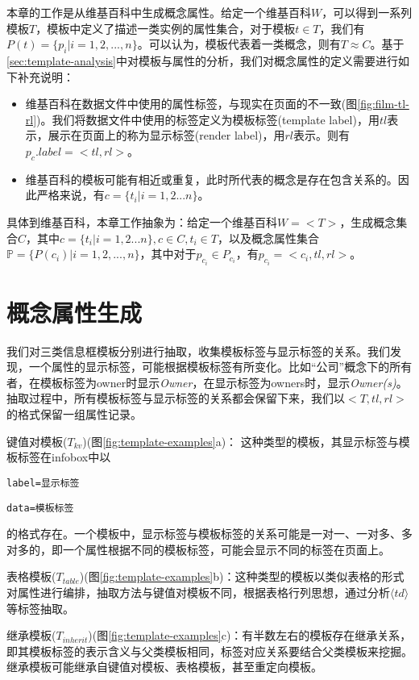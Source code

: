 本章的工作是从维基百科中生成概念属性。给定一个维基百科$W$，可以得到一系列模板$T$，模板中定义了描述一类实例的属性集合，对于模板$t \in T$，我们有$P(t)=\{p_{i}|i=1,2,...,n\}$。可以认为，模板代表着一类概念，则有$T \approx C$。基于\ref{sec:template-analysis}中对模板与属性的分析，我们对概念属性的定义需要进行如下补充说明：
\begin{itemize}
\item 维基百科在数据文件中使用的属性标签，与现实在页面的不一致(图\ref{fig:film-tl-rl})。我们将数据文件中使用的标签定义为模板标签(template label)，用$tl$表示，展示在页面上的称为显示标签(render label)，用$rl$表示。则有$p_{c}.label = <tl, rl>$。
\item 维基百科的模板可能有相近或重复，此时所代表的概念是存在包含关系的。因此严格来说，有$c = \{t_i|i=1,2...n\}$。
\end{itemize}

具体到维基百科，本章工作抽象为：给定一个维基百科$W = <T>$，生成概念集合$C$，其中$c = \{t_i|i=1,2...n\}, c \in C, t_i \in T$，以及概念属性集合$\mathbb{P} = \{P(c_i)| i = 1,2,...,n\}$，其中对于$p_{c_i} \in P_{c_i}$，有$p_{c_i} = <c_i, tl, rl>$。

\section{概念属性生成}
\label{sec:property-extraction}

我们对三类信息框模板分别进行抽取，收集模板标签与显示标签的关系。我们发现，一个属性的显示标签，可能根据模板标签有所变化。比如“公司”概念下的所有者，在模板标签为owner时显示\textit{Owner}，在显示标签为owners时，显示\textit{Owner(s)}。抽取过程中，所有模板标签与显示标签的关系都会保留下来，我们以$<T, tl, rl>$ 的格式保留一组属性记录。

{\heiti 键值对模板($T_{kv}$)(图\ref{fig:template-examples}a)：} 这种类型的模板，其显示标签与模板标签在infobox中以

\begin{center}
\verb"label=显示标签"

\verb"data=模板标签"
\end{center}
的格式存在。一个模板中，显示标签与模板标签的关系可能是一对一、一对多、多对多的，即一个属性根据不同的模板标签，可能会显示不同的标签在页面上。

{\heiti 表格模板($T_{table}$)(图\ref{fig:template-examples}b)：}这种类型的模板以类似表格的形式对属性进行编排，抽取方法与键值对模板不同，根据表格行列思想，通过分析$\langle td\rangle$等标签抽取。

{\heiti 继承模板($T_{inherit}$)(图\ref{fig:template-examples}c)：}有半数左右的模板存在继承关系，即其模板标签的表示含义与父类模板相同，标签对应关系要结合父类模板来挖掘。继承模板可能继承自键值对模板、表格模板，甚至重定向模板。

